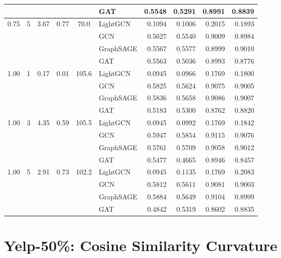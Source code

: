 {\begin{longtable}{cccccl rrrr}
 & & & & & GAT & 0.5548 & 0.5291 & 0.8991 & 0.8839 \\
\midrule
\multirow{4}{*}{0.75} & \multirow{4}{*}{5} & \multirow{4}{*}{3.67} & \multirow{4}{*}{0.77} & \multirow{4}{*}{70.0} & LightGCN & 0.1094 & 0.1006 & 0.2015 & 0.1893 \\
 & & & & & GCN & 0.5627 & 0.5540 & 0.9009 & 0.8984 \\
 & & & & & GraphSAGE & 0.5567 & 0.5577 & 0.8999 & 0.9010 \\
 & & & & & GAT & 0.5563 & 0.5036 & 0.8993 & 0.8776 \\
\midrule
\multirow{4}{*}{1.00} & \multirow{4}{*}{1} & \multirow{4}{*}{0.17} & \multirow{4}{*}{0.01} & \multirow{4}{*}{105.6} & LightGCN & 0.0945 & 0.0966 & 0.1769 & 0.1800 \\
 & & & & & GCN & 0.5825 & 0.5624 & 0.9075 & 0.9005 \\
 & & & & & GraphSAGE & 0.5836 & 0.5658 & 0.9086 & 0.9007 \\
 & & & & & GAT & 0.5183 & 0.5300 & 0.8762 & 0.8820 \\
\midrule
\multirow{4}{*}{1.00} & \multirow{4}{*}{3} & \multirow{4}{*}{4.35} & \multirow{4}{*}{0.59} & \multirow{4}{*}{105.5} & LightGCN & 0.0945 & 0.0992 & 0.1769 & 0.1842 \\
 & & & & & GCN & 0.5947 & 0.5854 & 0.9115 & 0.9076 \\
 & & & & & GraphSAGE & 0.5761 & 0.5709 & 0.9058 & 0.9012 \\
 & & & & & GAT & 0.5477 & 0.4665 & 0.8946 & 0.8457 \\
\midrule
\multirow{4}{*}{1.00} & \multirow{4}{*}{5} & \multirow{4}{*}{2.91} & \multirow{4}{*}{0.73} & \multirow{4}{*}{102.2} & LightGCN & 0.0945 & 0.1135 & 0.1769 & 0.2083 \\
 & & & & & GCN & 0.5812 & 0.5611 & 0.9081 & 0.9003 \\
 & & & & & GraphSAGE & 0.5884 & 0.5649 & 0.9104 & 0.8999 \\
 & & & & & GAT & 0.4842 & 0.5319 & 0.8602 & 0.8835 \\
\midrule
\end{longtable}
}

\section{Yelp-50\%: Cosine Similarity Curvature}

